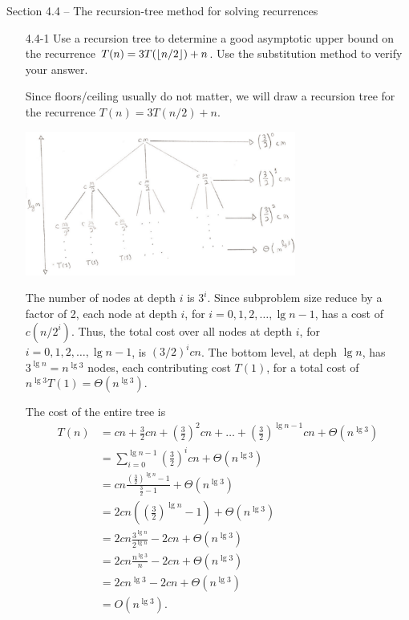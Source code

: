 \newpage

{\large Section 4.4 {--} The recursion-tree method for solving recurrences}

\begin{enumerate}

\item[4.4{-}1]{Use a recursion tree to determine a good asymptotic upper bound
on the recurrence $T(n) = 3T(\lfloor n/2\rfloor) + n$. Use the substitution method to
verify your answer.}

\begin{framed}
Since floors/ceiling usually do not matter, we will draw a recursion tree for
the recurrence $T(n) = 3T(n/2) + n$.

\begin{center}
\includegraphics[width=0.7\textwidth]{images/4_4_1_1.pdf}
\end{center}

The number of nodes at depth $i$ is $3^i$. Since subproblem size reduce by
a factor of 2, each node at depth $i$, for $i = 0, 1, 2, \dots, \lg n - 1$,
has a cost of $c (n/2^i)$. Thus, the total cost over all nodes at depth
$i$, for $i = 0, 1, 2, \dots, \lg n - 1$, is $(3/2)^i cn$. The bottom level,
at deph $\lg n$, has $3^{\lg n} = n^{\lg 3}$ nodes, each contributing cost
$T(1)$, for a total cost of $n^{\lg 3} T(1) = \Theta(n^{\lg 3})$.

The cost of the entire tree is
\begin{equation*}
\begin{aligned}
T(n) &= cn + \frac{3}{2} cn + \left(\frac{3}{2}\right)^2 cn + \dots
           + \left(\frac{3}{2}\right)^{\lg n - 1} cn + \Theta\left({n^{\lg 3}}\right)\\
     &= \sum_{i = 0}^{\lg n - 1} \left(\frac{3}{2}\right)^i cn + \Theta(n^{\lg 3})\\
     &= cn \frac{\left(\frac{3}{2}\right)^{\lg n} - 1}{\frac{3}{2} - 1} + \Theta(n^{\lg 3})\\
     &= 2cn \left(\left(\frac{3}{2}\right)^{\lg n} - 1\right) + \Theta(n^{\lg 3})\\
     &= 2cn \frac{3^{\lg n}}{2^{\lg n}} - 2cn + \Theta(n^{\lg 3})\\
     &= 2cn \frac{n^{\lg 3}}{n} - 2cn + \Theta(n^{\lg 3})\\
     &= 2cn^{\lg 3} - 2cn + \Theta(n^{\lg 3})\\
     &= O(n^{\lg 3}).
\end{aligned}
\end{equation*}


\end{framed}
\end{enumerate}
